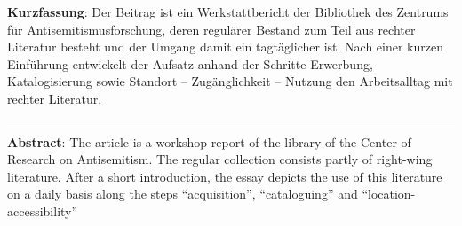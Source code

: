 \textbf{Kurzfassung}: Der Beitrag ist ein Werkstattbericht der
Bibliothek des Zentrums für Antisemitismusforschung, deren regulärer
Bestand zum Teil aus rechter Literatur besteht und der Umgang damit ein
tagtäglicher ist. Nach einer kurzen Einführung entwickelt der Aufsatz
anhand der Schritte Erwerbung, Katalogisierung sowie Standort --
Zugänglichkeit -- Nutzung den Arbeitsalltag mit rechter Literatur.

\begin{center}\rule{0.5\linewidth}{\linethickness}\end{center}

\textbf{Abstract}: The article is a workshop report of the library of
the Center of Research on Antisemitism. The regular collection consists
partly of right-wing literature. After a short introduction, the essay
depicts the use of this literature on a daily basis along the steps
``acquisition'', ``cataloguing'' and ``location-accessibility''
